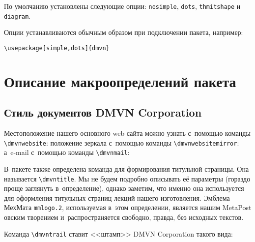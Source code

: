 \documentclass[a4paper]{article}
\begin{document}
По умолчанию установлены следующие опции: \texttt{nosimple}, \texttt{dots}, \texttt{thmitshape}
и \texttt{diagram}.


Опции устанавливаются обычным образом при подключении пакета, например:
\begin{verbatim}
\usepackage[simple,dots]{dmvn}
\end{verbatim}

\pagebreak

\section{Описание макроопределений пакета}

\subsection{Стиль документов DMVN Corporation}

Местоположение нашего основного web сайта можно узнать с~помощью команды \verb'\dmvnwebsite':
\cent{\dmvnwebsite{},}
положение зеркала с~помощью команды \verb'\dmvnwebsitemirror':
\cent{\dmvnwebsitemirror{},}
а~e-mail с~помощью команды
\verb'\dmvnmail':

В~пакете также определена команда для формирования титульной страницы. Она называется
\verb'\dmvntitle'. Мы не будем подробно описывать её параметры (гораздо проще заглянуть в~определение),
однако заметим, что именно она используется для оформления титульных страниц лекций нашего
изготовления. Эмблема МехМата \verb'mmlogo.2', используемая в~этом определении,
является нашим MetaPost овским творением и~распространяется свободно, правда,
без исходных текстов.

Команда \verb'\dmvntrail' ставит <<штамп>>  DMVN Corporation такого вида:

\medskip\dmvntrail
\end{document}
